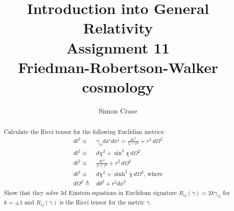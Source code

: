 \documentclass[]{article}
\title{Introduction into General Relativity\\Assignment 11\\Friedman-Robertson-Walker cosmology}
\author{Simon Crase}
\begin{document}
\maketitle

\begin{abstract}
Calculate the Ricci tensor for the following Euclidian metrics:
\begin{align*}
dl^2\equiv&\gamma_{ij}dx^idx^j=\frac{dr^2}{1-r^2}+r^2\,d\Omega^2\\
dl^2\equiv&d\chi^2+\sin^2 \chi\,d\Omega^2\\
dl^2\equiv&\frac{dr^2}{1+r^2}+r^2\,d\Omega^2\\
dl^2\equiv&d\chi^2+\sinh^2 \chi\,d\Omega^2\text{, where}\\
d\Omega^2\triangleq & d\theta^2 + r^2 d\phi^2
\end{align*}
Show that they solve 3d Einstein equations in Euclidean signature $R_{ij}(\gamma)=2k\gamma_{ij}$ for $k=\pm 1$ and $R_{ij}(\gamma)$ is the Ricci tensor for the metric $\gamma$.
\end{abstract}

\tableofcontents
\end{document}
